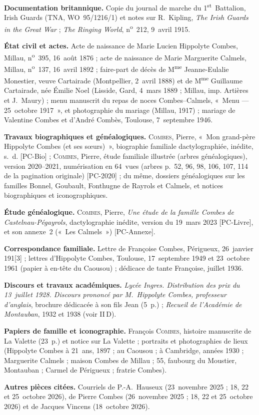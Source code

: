 \begin{biblist}
\item \textbf{Documentation britannique.} Copie du journal de marche du 1\textsuperscript{st}~Battalion, Irish Guards (TNA, WO~95/1216/1) et notes sur R.~Kipling, \textit{The Irish Guards in the Great War} ; \textit{The Ringing World}, n\textsuperscript{o}~212, 9~avril 1915.
\item \textbf{État civil et actes.} Acte de naissance de Marie Lucien Hippolyte Combes, Millau, n\textsuperscript{o}~395, 16~août 1876 ; acte de naissance de Marie Marguerite Calmels, Millau, n\textsuperscript{o}~137, 16~avril 1892 ; faire-part de décès de M\textsuperscript{me} Jeanne-Eulalie Monestier, veuve Cartairade (Montpellier, 2~avril 1888) et de M\textsuperscript{me} Guillaume Cartairade, née Émilie Noel (Lisside, Gard, 4~mars 1889 ; Millau, imp. Artières et J.~Maury) ; menu manuscrit du repas de noces Combes--Calmels, «~Menu --- 25~octobre 1917~», et photographie du mariage (Millau, 1917) ; mariage de Valentine Combes et d'André Combès, Toulouse, 7~septembre 1946.
\item \textbf{Travaux biographiques et généalogiques.} \textsc{Combes}, Pierre, «~Mon grand-père Hippolyte Combes (et ses sœurs)~», biographie familiale dactylographiée, inédite, s.~d. [PC-Bio] ; \textsc{Combes}, Pierre, étude familiale illustrée (arbres généalogiques), version 2020--2021, numérisation en 64~vues (arbres p.~52, 96, 98, 106, 107, 114 de la pagination originale) [PC-2020] ; du même, dossiers généalogiques sur les familles Bonnel, Goubault, Fonthugne de Rayrols et Calmels, et notices biographiques et iconographiques.
\item \textbf{Étude généalogique.} \textsc{Combes}, Pierre, \textit{Une étude de la famille Combes de Castelnau-Pégayrols}, dactylographie inédite, version du 19~mars 2023 [PC-Livre], et son annexe~2 («~Les Calmels~») [PC-Annexe].
\item \textbf{Correspondance familiale.} Lettre de Françoise Combes, Périgueux, 26~janvier 191[3] ; lettres d'Hippolyte Combes, Toulouse, 17~septembre 1949 et 23~octobre 1961 (papier à en-tête du Caousou) ; dédicace de tante Françoise, juillet 1936.
\item \textbf{Discours et travaux académiques.} \textit{Lycée Ingres. Distribution des prix du 13~juillet 1928. Discours prononcé par M.~Hippolyte Combes, professeur d'anglais}, brochure dédicacée à son fils Jean (5~p.) ; \textit{Recueil de l'Académie de Montauban}, 1932 et 1938 (voir II\,D).
\item \textbf{Papiers de famille et iconographie.} François \textsc{Combes}, histoire manuscrite de La Valette (23~p.) et notice sur La Valette ; portraits et photographies de lieux (Hippolyte Combes à 21~ans, 1897 ; au Caousou ; à Cambridge, années 1930 ; Marguerite Calmels ; maison Combes de Millau ; 55, faubourg du Moustier, Montauban ; Carmel de Périgueux ; fratrie Combes).
\item \textbf{Autres pièces citées.} Courriels de P.-A.~Hauseux (23~novembre 2025 ; 18, 22 et 25~octobre 2026), de Pierre Combes (26~novembre 2025 ; 18, 22 et 25~octobre 2026) et de Jacques Vincens (18~octobre 2026).
\end{biblist}


